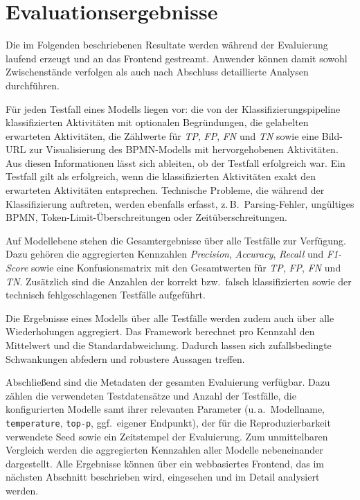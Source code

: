 \section{Evaluationsergebnisse}\label{sec:generierte-resultate}

Die im Folgenden beschriebenen Resultate werden während der Evaluierung laufend erzeugt und an das Frontend gestreamt. Anwender können damit sowohl Zwischenstände verfolgen als auch nach Abschluss detaillierte Analysen durchführen.

Für jeden Testfall eines Modells liegen vor: die von der Klassifizierungspipeline klassifizierten Aktivitäten mit optionalen Begründungen, die gelabelten erwarteten Aktivitäten, die Zählwerte für \emph{\ac{TP}}, \emph{\ac{FP}}, \emph{\ac{FN}} und \emph{\ac{TN}} sowie eine Bild-URL zur Visualisierung des \ac{BPMN}-Modells mit hervorgehobenen Aktivitäten. Aus diesen Informationen lässt sich ableiten, ob der Testfall erfolgreich war. Ein Testfall gilt als erfolgreich, wenn die klassifizierten Aktivitäten exakt den erwarteten Aktivitäten entsprechen. Technische Probleme, die während der Klassifizierung auftreten, werden ebenfalls erfasst, z.\,B.\ Parsing-Fehler, ungültiges \ac{BPMN}, Token-Limit-Überschreitungen oder Zeitüberschreitungen.

Auf Modellebene stehen die Gesamtergebnisse über alle Testfälle zur Verfügung. Dazu gehören die aggregierten Kennzahlen \emph{Precision}, \emph{Accuracy}, \emph{Recall} und \emph{F1-Score} sowie eine Konfusionsmatrix mit den Gesamtwerten für \emph{\ac{TP}}, \emph{\ac{FP}}, \emph{\ac{FN}} und \emph{\ac{TN}}. Zusätzlich sind die Anzahlen der korrekt bzw.\ falsch klassifizierten sowie der technisch fehlgeschlagenen Testfälle aufgeführt.

Die Ergebnisse eines Modells über alle Testfälle werden zudem auch über alle Wiederholungen aggregiert. Das Framework berechnet pro Kennzahl den Mittelwert und die Standardabweichung. Dadurch lassen sich zufallsbedingte Schwankungen abfedern und robustere Aussagen treffen.

Abschließend sind die Metadaten der gesamten Evaluierung verfügbar. Dazu zählen die verwendeten Testdatensätze und Anzahl der Testfälle, die konfigurierten Modelle samt ihrer relevanten Parameter (u.\,a.\ Modellname, \texttt{temperature}, \texttt{top-p}, ggf.\ eigener Endpunkt), der für die Reproduzierbarkeit verwendete Seed sowie ein Zeitstempel der Evaluierung. Zum unmittelbaren Vergleich werden die aggregierten Kennzahlen aller Modelle nebeneinander dargestellt. Alle Ergebnisse können über ein webbasiertes Frontend, das im nächsten Abschnitt beschrieben wird, eingesehen und im Detail analysiert werden.

